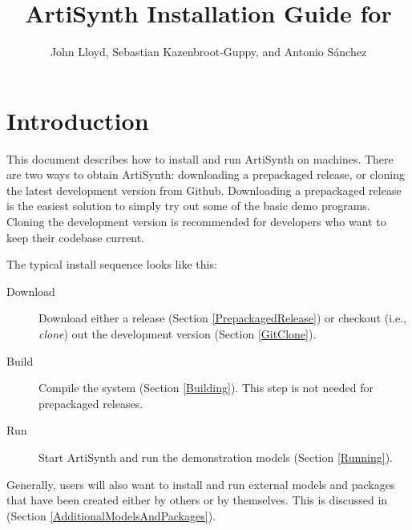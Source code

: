 \def\ArtHome[#1]{{\tt <ARTISYNTH\_HOME>#1}}

\title{ArtiSynth Installation Guide for \SYSTEM{}}
\author{John Lloyd, Sebastian Kazenbroot-Guppy, and Antonio S{\'a}nchez}
\iflatexml
\date{}
\fi

\newif\ifNeedLibraryPath
\NeedLibraryPathfalse



\maketitle

\iflatexml{\large\pubdate}\fi

\tableofcontents

\section{Introduction}

This document describes how to install and run ArtiSynth
on \FULLSYSTEM{} machines. There are two ways to obtain ArtiSynth:
downloading a prepackaged release, or cloning the latest development
version from Github. Downloading a prepackaged release is the easiest
solution to simply try out some of the basic demo programs. Cloning
the development version is recommended for developers who want to keep
their codebase current.

The typical install sequence looks like this:

\begin{description}

\item[Download]\mbox{}

Download either a release (Section \ref{PrepackagedRelease}) or
checkout (i.e., {\it clone}) out the development version
(Section \ref{GitClone}).

\item[Build]\mbox{}

Compile the system (Section \ref{Building}). This
step is not needed for prepackaged releases.

\item[Run]\mbox{}

Start ArtiSynth and run the demonstration models (Section \ref{Running}).

\end{description}

Generally, users will also want to install and run external models and
packages that have been created either by others or by themselves.
This is discussed in (Section \ref{AdditionalModelsAndPackages}).


